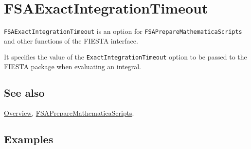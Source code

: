 \documentclass[../FeynHelpersManual.tex]{subfiles}
\begin{document}
\hypertarget{fsaexactintegrationtimeout}{
\section{FSAExactIntegrationTimeout}\label{fsaexactintegrationtimeout}}

\texttt{FSAExactIntegrationTimeout} is an option for
\texttt{FSAPrepareMathematicaScripts} and other functions of the FIESTA
interface.

It specifies the value of the \texttt{ExactIntegrationTimeout} option to
be passed to the FIESTA package when evaluating an integral.

\subsection{See also}

\hyperlink{toc}{Overview},
\hyperlink{fsapreparemathematicascripts}{FSAPrepareMathematicaScripts}.

\subsection{Examples}
\end{document}
